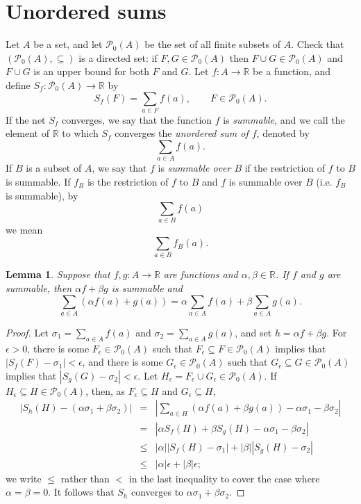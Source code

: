 \documentclass{article}
\newtheorem{lemma}[theorem]{Lemma}
\begin{document}
\section{Unordered sums}
Let $A$ be a set, and let $\mathscr{P}_0(A)$ be the set of all finite subsets of $A$. 
Check that $(\mathscr{P}_0(A),\subseteq)$ is a directed set:
if $F,G \in \mathscr{P}_0(A)$  then
$F \cup G \in \mathscr{P}_0(A)$ and $F \cup G$ is an upper bound for both $F$ and $G$. Let $f:A \to \mathbb{R}$ be a function, and define $S_f:\mathscr{P}_0(A) \to \mathbb{R}$ by
\[
S_f(F) =\sum_{a \in F} f(a), \qquad F \in \mathscr{P}_0(A).
\]
If the net $S_f$ converges, we say that the function $f$ is {\em summable}, and we call the element of $\mathbb{R}$ to which $S_f$ converges the {\em unordered sum of $f$},
denoted by
\[
\sum_{a \in A} f(a).
\]
If $B$ is a subset of $A$, we say that $f$ is {\em summable over $B$} if the restriction of $f$ to $B$ is summable. If $f_B$ is the restriction of $f$ to $B$
and $f$ is summable over $B$ (i.e. $f_B$ is summable), by 
\[
\sum_{a \in B} f(a) 
\]
we mean
\[
\sum_{a \in B} f_B(a).
\]


\begin{lemma}
Suppose that $f,g:A \to \mathbb{R}$ are functions and  $\alpha,\beta \in \mathbb{R}$. If $f$ and $g$ are summable,
then $\alpha f+  \beta g$ is summable and
\[
\sum_{a \in A} (\alpha f(a)+ g(a)) = \alpha \sum_{a \in A} f(a) + \beta  \sum_{a \in A} g(a).
\]
\label{linearity}
\end{lemma}
\begin{proof}
Let $\sigma_1=\sum_{a \in A} f(a)$ and $\sigma_2=\sum_{a \in A} g(a)$, and set $h = \alpha f+ \beta g$.
For $\epsilon>0$, there is some $F_\epsilon \in \mathscr{P}_0(A)$ such that $F_\epsilon \subseteq F \in \mathscr{P}_0(A)$ implies
that $|S_f(F)-\sigma_1|<\epsilon$, and there is some $G_\epsilon \in \mathscr{P}_0(A)$ such that
$G_\epsilon \subseteq G \in \mathscr{P}_0(A)$ implies that $|S_g(G)-\sigma_2|<\epsilon$. Let $H_\epsilon = F_\epsilon \cup G_\epsilon
 \in \mathscr{P}_0(A)$. If $H_\epsilon \subseteq H \in \mathscr{P}_0(A)$, then, as $F_\epsilon \subseteq H$ and $G_\epsilon \subseteq H$,
\begin{eqnarray*}
|S_h(H)- (\alpha \sigma_1 + \beta \sigma_2)|&=&\left|\sum_{a \in H} (\alpha f(a)+\beta g(a)) - \alpha \sigma_1 - \beta \sigma_2 \right|\\
&=&| \alpha S_f(H)+\beta S_g(H) - \alpha \sigma_1 -\beta  \sigma_2|\\
&\leq&|\alpha| |S_f(H) - \sigma_1| +|\beta| |S_g(H)-\sigma_2|\\
&\leq&|\alpha| \epsilon +|\beta| \epsilon;
\end{eqnarray*}
we write $\leq$ rather than $<$ in the last inequality to cover the case where $\alpha=\beta=0$. 
It follows that $S_h$ converges to $\alpha \sigma_1 + \beta \sigma_2$. 
\end{proof}
\end{document}
